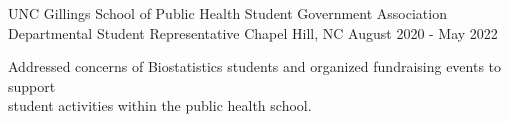 \begin{cventries}
  \cventry
    {UNC Gillings School of Public Health Student Government Association} %
    {Departmental Student Representative} %
    {Chapel Hill, NC} %
    {August 2020 - May 2022} %
    {
      \begin{cvitems} %
        \item Addressed concerns of Biostatistics students and organized fundraising events to support \\ student activities within the public health school.
      \end{cvitems}
    }
    
    
\end{cventries}
